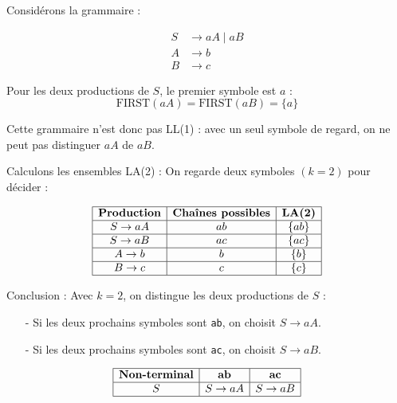 \begin{example}
    Considérons la grammaire :
        
        \[
            \begin{aligned}
                S &\to aA \mid aB \\
                A &\to b \\
                B &\to c
            \end{aligned}
        \]

    Pour les deux productions de $S$, le premier symbole est $a$ :
        \[
            \text{FIRST}(aA) = \text{FIRST}(aB) = \{a\}
        \]

    Cette grammaire n'est donc {pas LL(1)} : avec un seul symbole de regard, on ne peut pas distinguer $aA$ de $aB$.

    {Calculons les ensembles LA(2)} : On regarde deux symboles $(k=2)$ pour décider :

        \[
            \begin{array}{|c|c|c|}
                \hline
                \textbf{Production} & \textbf{Chaînes possibles} & \textbf{LA(2)} \\
                \hline
                S \to aA & ab & \{ab\} \\
                \hline
                S \to aB & ac & \{ac\} \\
                \hline
                A \to b & b & \{b\} \\
                \hline
                B \to c & c & \{c\} \\
                \hline
            \end{array}
        \]

    {Conclusion :} Avec $k=2$, on distingue les deux productions de $S$ :
    \begin{itemize}
        \item[-] Si les deux prochains symboles sont \texttt{ab}, on choisit $S \to aA$.
        \item[-] Si les deux prochains symboles sont \texttt{ac}, on choisit $S \to aB$.
    \end{itemize}

        \[
            \begin{array}{|c|c|c|}
                \hline
                \textbf{Non-terminal} & \textbf{ab} & \textbf{ac} \\
                \hline
                S & S \to aA & S \to aB \\
                \hline
            \end{array}
        \]


\end{example}
